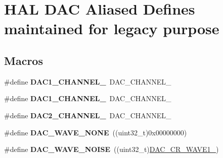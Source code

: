 \hypertarget{group___h_a_l___d_a_c___aliased___defines}{}\section{H\+AL D\+AC Aliased Defines maintained for legacy purpose}
\label{group___h_a_l___d_a_c___aliased___defines}
\subsection*{Macros}
\begin{DoxyCompactItemize}
\item 
\#define {\bfseries D\+A\+C1\+\_\+\+C\+H\+A\+N\+N\+E\+L\+\_}~D\+A\+C\+\_\+\+C\+H\+A\+N\+N\+E\+L\+\_\hypertarget{group___h_a_l___d_a_c___aliased___defines_gacd0eabd250f1026912b0e3f7deecb2e7}{}\label{group___h_a_l___d_a_c___aliased___defines_gacd0eabd250f1026912b0e3f7deecb2e7}

\item 
\#define {\bfseries D\+A\+C1\+\_\+\+C\+H\+A\+N\+N\+E\+L\+\_}~D\+A\+C\+\_\+\+C\+H\+A\+N\+N\+E\+L\+\_\hypertarget{group___h_a_l___d_a_c___aliased___defines_ga6358f0c4cfc9a0e67a739bf6cf17870c}{}\label{group___h_a_l___d_a_c___aliased___defines_ga6358f0c4cfc9a0e67a739bf6cf17870c}

\item 
\#define {\bfseries D\+A\+C2\+\_\+\+C\+H\+A\+N\+N\+E\+L\+\_}~D\+A\+C\+\_\+\+C\+H\+A\+N\+N\+E\+L\+\_\hypertarget{group___h_a_l___d_a_c___aliased___defines_ga8d40044bd0865cdb12fea604852f2582}{}\label{group___h_a_l___d_a_c___aliased___defines_ga8d40044bd0865cdb12fea604852f2582}

\item 
\#define {\bfseries D\+A\+C\+\_\+\+W\+A\+V\+E\+\_\+\+N\+O\+NE}~((uint32\+\_\+t)0x00000000)\hypertarget{group___h_a_l___d_a_c___aliased___defines_ga7e80010819867e162e936510093a4cef}{}\label{group___h_a_l___d_a_c___aliased___defines_ga7e80010819867e162e936510093a4cef}

\item 
\#define {\bfseries D\+A\+C\+\_\+\+W\+A\+V\+E\+\_\+\+N\+O\+I\+SE}~((uint32\+\_\+t)\hyperlink{group___peripheral___registers___bits___definition_ga0871e6466e3a7378103c431832ae525a}{D\+A\+C\+\_\+\+C\+R\+\_\+\+W\+A\+V\+E1\+\_})\hypertarget{group___h_a_l___d_a_c___aliased___defines_ga4585a41ff6dfd14971119283f1d8045b}{}\label{group___h_a_l___d_a_c___aliased___defines_ga4585a41ff6dfd14971119283f1d8045b}


\end{DoxyCompactItemize}
